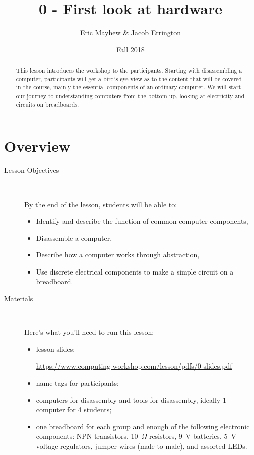\documentclass[11pt]{article}
\title{0 - First look at hardware}
\author{Eric Mayhew & Jacob Errington}
\date{Fall 2018}
\newcommand{\cwurl}{https://www.computing-workshop.com/lesson/pdfs/}
\begin{document}
\renewcommand{\abstractname}{\vspace{-\baselineskip}}
\maketitle
\begin{abstract}
  This lesson introduces the workshop to the participants. Starting with
  disassembling a computer, participants will get a bird's eye view as to the
  content that will be covered in the course, mainly the essential components of
  an ordinary computer. We will start our journey to understanding computers
  from the bottom up, looking at electricity and circuits on breadboards.
\end{abstract}
\section*{Overview}
\begin{description}
  \item [Lesson Objectives]
    ~

   By the end of the lesson, students will be able to:
  \begin{itemize}

    \item Identify and describe the function of common computer components,

    \item Disassemble a computer,

    \item Describe how a computer works through abstraction,

    \item Use discrete electrical components to make a simple circuit on a breadboard.

  \end{itemize}
  \item [Materials]~

Here's what you'll need to run this lesson:
  \begin{itemize}
    \item
      lesson slides;

      \url{\cwurl 0-slides.pdf}

    \item
      name tags for participants;

    \item
      computers for disassembly and tools for disassembly, ideally 1
      computer for 4 students;

    \item
      one breadboard for each group and enough of the following electronic
      components:
      NPN transistors,
      10~$\Omega$ resistors,
      9~V batteries,
      5~V voltage regulators,
      jumper wires (male to male),
      and assorted LEDs.

  \end{itemize}
\end{description}
\end{document}
